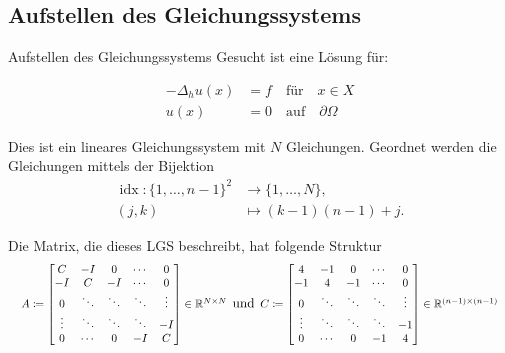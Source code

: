 \documentclass[9pt, t]{beamer}
\begin{document}
\subsection{Aufstellen des Gleichungssystems}
\begin{frame}{Aufstellen des Gleichungssystems}
 Gesucht ist eine Lösung für:

\begin{align*}    
    -\Delta_h u(x) &= f \quad \text{für} \quad x \in X
 \\
              u(x) &= 0 \quad \text{auf} \quad \partial \Omega
\end{align*}

Dies ist ein lineares Gleichungssystem mit \(N\) Gleichungen.
Geordnet werden die Gleichungen mittels der Bijektion
\begin{align*}
    \operatorname{idx}: \{1, \ldots, n - 1\}^2 & \longrightarrow \{1, \ldots , N\}, \\
    (j, k)                                     & \longmapsto (k - 1)(n - 1) + j.
\end{align*}

Die Matrix, die dieses LGS beschreibt, hat folgende Struktur 
\[
\begin{array}{ccc}
  \scalebox{0.85}{$
  \begin{array}{l}
    A \coloneq \begin{bmatrix}
    C & -I & 0 & \cdots & 0 \\
    -I & C & -I & \cdots & 0 \\
    0 & \ddots & \ddots & \ddots & \vdots \\
    \vdots & \ddots & \ddots & \ddots & -I \\
    0 & \cdots & 0 & -I & C
    \end{bmatrix}
    \in \mathbb{R}^{N \times N}
  \end{array}
  $}
  
  \text{und}
  
  \scalebox{0.85}{$
  \begin{array}{l}
    C \coloneq \begin{bmatrix}
    4 & -1 & 0 & \cdots & 0 \\
    -1 & 4 & -1 & \cdots & 0 \\
    0 & \ddots & \ddots & \ddots & \vdots \\
    \vdots & \ddots & \ddots & \ddots & -1 \\
    0 & \cdots & 0 & -1 & 4
    \end{bmatrix}
    \in \mathbb{R}^{(n-1) \times (n-1)}
  \end{array}
  $}
\end{array}
\]

\end{frame}
\end{document}
